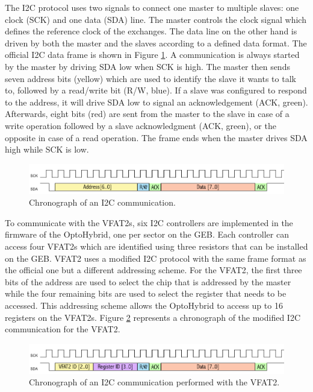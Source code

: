       The I2C protocol uses two signals to connect one master to multiple slaves: one clock (SCK) and one data (SDA) line. The master controls the clock signal which defines the reference clock of the exchanges. The data line on the other hand is driven by both the master and the slaves according to a defined data format. The official I2C data frame is shown in Figure \ref{fig:II-3-i2c}. A communication is always started by the master by driving SDA low when SCK is high. The master then sends seven address bits (yellow) which are used to identify the slave it wants to talk to, followed by a read/write bit (R/W, blue). If a slave was configured to respond to the address, it will drive SDA low to signal an acknowledgement (ACK, green). Afterwards, eight bits (red) are sent from the master to the slave in case of a write operation followed by a slave acknowledgment (ACK, green), or the opposite in case of a read operation. The frame ends when the master drives SDA high while SCK is low. \\

      \begin{figure}[h!]
        \centering
        \includegraphics[width=\textwidth]{img/II-3-test-beam/i2c.png}
        \caption{Chronograph of an I2C communication.}
        \label{fig:II-3-i2c}
      \end{figure}

      To communicate with the VFAT2s, six I2C controllers are implemented in the firmware of the OptoHybrid, one per sector on the GEB. Each controller can access four VFAT2s which are identified using three resistors that can be installed on the GEB. VFAT2 uses a modified I2C protocol with the same frame format as the official one but a different addressing scheme. For the VFAT2, the first three bits of the address are used to select the chip that is addressed by the master while the four remaining bits are used to select the register that needs to be accessed. This addressing scheme allows the OptoHybrid to access up to 16 registers on the VFAT2s. Figure \ref{fig:II-3-i2c-vfat2} represents a chronograph of the modified I2C communication for the VFAT2. \\

      \begin{figure}[h!]
        \centering
        \includegraphics[width=\textwidth]{img/II-3-test-beam/i2c-vfat2.png}
        \caption{Chronograph of an I2C communication performed with the VFAT2.}
        \label{fig:II-3-i2c-vfat2}
      \end{figure}

